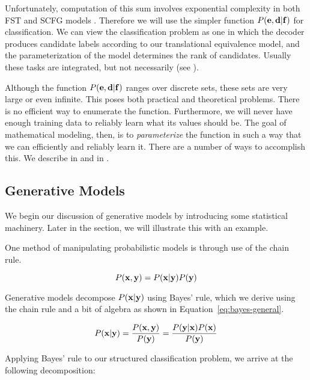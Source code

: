 \noindent Unfortunately, computation of this sum involves
exponential complexity in both 
FST \citep{Brown:1993:cl} and
SCFG models \citep{Melamed:2004:acl:smtbyp}.  Therefore
we will use the simpler function $P({\bf e},{\bf d}|{\bf f})$
for classification.
We can view the classification problem as one in which
the decoder produces candidate labels according to
our translational equivalence model, and the parameterization
of the model determines the rank of candidates.  Usually these
tasks are integrated, but not necessarily 
(see ).

Although the function $P({\bf e},{\bf d}|{\bf f})$ ranges over
discrete sets, these sets are very large or even infinite.  
This poses both practical
and theoretical problems.  There is no efficient way to
enumerate the function.  Furthermore, we will never have
enough training data to reliably learn what its values
should be.  The goal of mathematical 
modeling, then, is to {\em parameterize} the function in such 
a way that we can efficiently and reliably learn it.  
There are a number of ways to accomplish this.
We describe 
in  
and 
in .

\subsection{Generative Models}\label{sec:generative-models}

We begin our discussion of generative models by 
introducing some statistical machinery.  Later in the
section, we will illustrate this with an example.

One method of manipulating probabilistic
models is through use of the chain rule.

\begin{equation}
P({\bf x},{\bf y}) = P({\bf x}|{\bf y}) P({\bf y})
\end{equation}

\noindent Generative models decompose 
$P({\bf x}|{\bf y})$ using Bayes' rule, which we derive
using the chain rule and a bit of algebra 
as shown in Equation~\ref{eq:bayes-general}.

\begin{equation}\label{eq:bayes-general}
P({\bf x}|{\bf y}) = \frac{P({\bf x},{\bf y})}{P({\bf y})} = 
\frac{P({\bf y}|{\bf x})P({\bf x})}{P({\bf y})} 
\end{equation}

\noindent Applying Bayes' rule to our structured
classification problem, we arrive at the following
decomposition:

